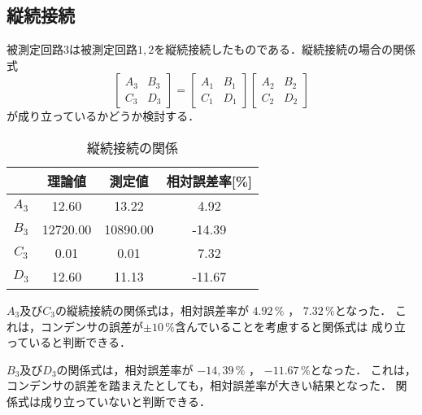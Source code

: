 \newpage

\subsection{縦続接続}
被測定回路3は被測定回路$1,2$を縦続接続したものである．縦続接続の場合の関係式
$$
\left[\begin{array}{ll}
A_3 & B_3 \\
C_3 & D_3
\end{array}\right]=\left[\begin{array}{ll}
A_1 & B_1 \\
C_1 & D_1
\end{array}\right]\left[\begin{array}{cc}
A_2 & B_2 \\
C_2 & D_2
\end{array}\right]
$$
が成り立っているかどうか検討する．

\begin{table}[!ht]
    \centering
    \caption{縦続接続の関係}
    \begin{tabular}{c|ccc}
    \hline
        & 理論値 & 測定値 & 相対誤差率[\%] \\ \hline
        $A_3$ & 12.60 & 13.22 & 4.92 \\ 
        $B_3$ & 12720.00 & 10890.00 & -14.39 \\ 
        $C_3$ & 0.01 & 0.01 & 7.32 \\ 
        $D_3$ & 12.60 & 11.13 & -11.67 \\ \hline
    \end{tabular}
\end{table}

$A_3$及び$C_3$の縦続接続の関係式は，相対誤差率が
$4.92\,\%$ ， $7.32\,\%$となった．
これは，コンデンサの誤差が$\pm10\,\%$含んでいることを考慮すると関係式は
成り立っていると判断できる．

$B_3$及び$D_3$の関係式は，相対誤差率が
$-14,39\,\%$ ， $-11.67\,\%$となった．
これは，コンデンサの誤差を踏まえたとしても，相対誤差率が大きい結果となった．
関係式は成り立っていないと判断できる．